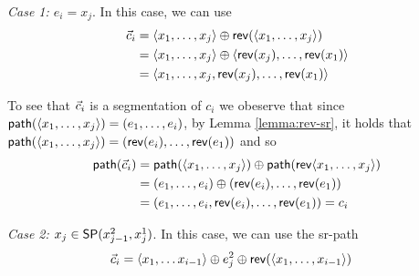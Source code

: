 \emph{Case 1: $e_i = x_j$}. In this case, we can use 
\begin{align*}
\sr{c}_i & = \langle x_1, \ldots, x_j \rangle \oplus \rev( \langle x_1, \ldots, x_j \rangle ) \\
& = \langle x_1, \ldots, x_j \rangle \oplus \langle \rev(x_j), \ldots, \rev(x_1) \rangle \\
& = \langle x_1, \ldots, x_j, \rev(x_j), \ldots, \rev(x_1) \rangle \\
\end{align*}

To see that $\sr{c}_i$ is a segmentation of $c_i$  we obeserve that since $\seq(\langle x_1, \ldots, x_j \rangle) = (e_1, \ldots, e_i)$, by Lemma \ref{lemma:rev-sr}, it holds that
$\seq(\langle x_1, \ldots, x_j \rangle) = (\rev(e_i), \ldots, \rev(e_1))$ and so
\begin{align*}
\seq(\sr{c}_i) & = \seq(\langle x_1, \ldots, x_j \rangle) \oplus \seq(\rev \langle x_1, \ldots, x_j \rangle) \\
& = (e_1, \ldots, e_i) \oplus (\rev(e_i), \ldots, \rev(e_1)) \\
& = (e_1, \ldots, e_i, \rev(e_i), \ldots, \rev(e_1)) = c_i
\end{align*}

\emph{Case 2: $x_j \in \sp(x^2_{j - 1}, x^1_j)$}. In this case, we can use the sr-path
\begin{align*}
\sr{c}_i & = \langle x_1, \ldots x_{i - 1} \rangle \oplus e^2_j \oplus \rev( \langle x_1, \ldots, x_{i - 1} \rangle ) 
\end{align*}

